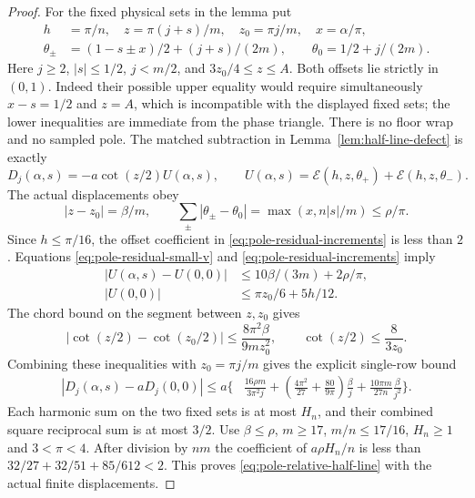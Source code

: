 \begin{proof}
For the fixed physical sets in the lemma put
\begin{align*}
 h&=\pi/n,\quad z=\pi(j+s)/m,\quad z_0=\pi j/m,\quad x=\alpha/\pi,\\
 \theta_\pm&=(1-s\pm x)/2+(j+s)/(2m),\qquad
 \theta_0=1/2+j/(2m).
\end{align*}
Here $j\geq2$, $|s|\leq1/2$, $j<m/2$, and
$3z_0/4\leq z\leq A$.  Both offsets lie strictly in $(0,1)$.
Indeed their possible upper equality would require simultaneously
$x-s=1/2$ and $z=A$, which is incompatible with the displayed
fixed sets; the lower inequalities are immediate from the phase triangle.
There is no floor wrap and no sampled pole.
The matched subtraction in Lemma~\ref{lem:half-line-defect} is exactly
\[
 D_j(\alpha,s)=-a\cot(z/2)U(\alpha,s),\qquad
 U(\alpha,s)=\mathcal E(h,z,\theta_+)+\mathcal E(h,z,\theta_-).
\]
The actual displacements obey
\[
 |z-z_0|=\beta/m,\qquad
 \sum_\pm|\theta_\pm-\theta_0|
       =\max(x,n|s|/m)\leq\rho/\pi.
\]
Since $h\leq\pi/16$, the offset coefficient in
\eqref{eq:pole-residual-increments} is less than $2$.
Equations \eqref{eq:pole-residual-small-v} and
\eqref{eq:pole-residual-increments} imply
\begin{align*}
 |U(\alpha,s)-U(0,0)|&\leq10\beta/(3m)+2\rho/\pi,\\
 |U(0,0)|&\leq\pi z_0/6+5h/12.
\end{align*}
The chord bound on the segment between $z,z_0$ gives
\[
 |\cot(z/2)-\cot(z_0/2)|\leq\frac{8\pi^2\beta}{9mz_0^2},
 \qquad \cot(z/2)\leq\frac8{3z_0}.
\]
Combining these inequalities with $z_0=\pi j/m$ gives the
explicit single-row bound
\begin{align*}
 |D_j(\alpha,s)-aD_j(0,0)|
 \leq a\biggl\{&\frac{16\rho m}{3\pi^2j}
       +\left(\frac{4\pi^2}{27}+\frac{80}{9\pi}\right)\frac\beta j
       +\frac{10\pi m}{27n}\frac\beta{j^2}\biggr\}.
\end{align*}
Each harmonic sum on the two fixed sets is at most $H_n$, and their
combined square reciprocal sum is at most $3/2$.
Use $\beta\leq\rho$, $m\geq17$, $m/n\leq17/16$,
$H_n\geq1$ and $3<\pi<4$.  After division by $nm$ the coefficient
of $a\rho H_n/n$ is less than
$32/27+32/51+85/612<2$.  This proves
\eqref{eq:pole-relative-half-line} with the actual finite displacements.
\end{proof}
